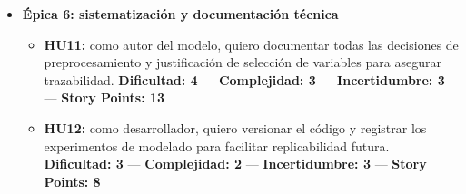 \documentclass[
11pt, %
]{charter}
\begin{document}
\begin{itemize}
  \item \textbf{Épica 6: sistematización y documentación técnica}
    \begin{itemize}
      \item \textbf{HU11:} como autor del modelo, quiero documentar todas las decisiones de preprocesamiento y justificación de selección de variables para asegurar trazabilidad.  
      \newline \textbf{Dificultad: 4} — \textbf{Complejidad: 3} — \textbf{Incertidumbre: 3} — \textbf{Story Points: 13}

      \item \textbf{HU12:} como desarrollador, quiero versionar el código y registrar los experimentos de modelado para facilitar replicabilidad futura.  
      \newline \textbf{Dificultad: 3} — \textbf{Complejidad: 2} — \textbf{Incertidumbre: 3} — \textbf{Story Points: 8}
    \end{itemize}




\end{itemize}
\end{document}
